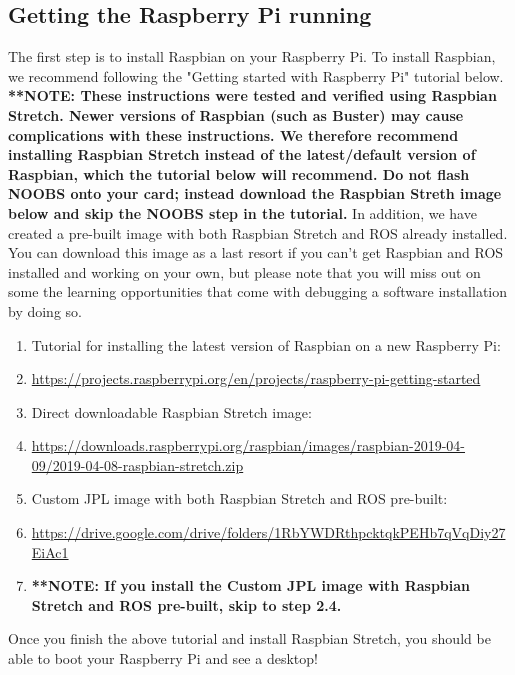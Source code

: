\documentclass{article}
\begin{document}
\subsection{Getting the Raspberry Pi running}
The first step is to install Raspbian on your Raspberry Pi. To install Raspbian,
we recommend following the "Getting started with Raspberry Pi" tutorial below.  \textbf{**NOTE: These instructions were tested and verified using Raspbian Stretch.  Newer versions of Raspbian (such as Buster) may cause complications with these instructions.  We therefore recommend installing Raspbian Stretch instead of the latest/default version of Raspbian, which the tutorial below will recommend.  Do not flash NOOBS onto your card; instead download the Raspbian Streth image below and skip the NOOBS step in the tutorial.}  In addition, we have created a pre-built image with both Raspbian Stretch and ROS already installed.  You can download this image as a last resort if you can't get Raspbian and ROS installed and working on your own, but please note that you will miss out on some the learning opportunities that come with debugging a software installation by doing so.  

\begin{enumerate}
	\item[] Tutorial for installing the latest version of Raspbian on a new Raspberry Pi:
	\item[] \href{https://projects.raspberrypi.org/en/projects/raspberry-pi-getting-started}{https://projects.raspberrypi.org/en/projects/raspberry-pi-getting-started}
	\item[] Direct downloadable Raspbian Stretch image: 
	\item[] \href{https://downloads.raspberrypi.org/raspbian/images/raspbian-2019-04-09/2019-04-08-raspbian-stretch.zip}{https://downloads.raspberrypi.org/raspbian/images/raspbian-2019-04-09/2019-04-08-raspbian-stretch.zip}
	\item[] Custom JPL image with both Raspbian Stretch and ROS pre-built:
	\item[] \href{https://drive.google.com/drive/folders/1RbYWDRthpcktqkPEHb7qVqDiy27EiAc1}{https://drive.google.com/drive/folders/1RbYWDRthpcktqkPEHb7qVqDiy27EiAc1}
	\item[] \textbf{**NOTE: If you install the Custom JPL image with Raspbian Stretch and ROS pre-built, skip to step 2.4.} 
\end{enumerate}

\noindent Once you finish the above tutorial and install Raspbian Stretch, you should be able to boot your Raspberry Pi and see a desktop!
\end{document}
